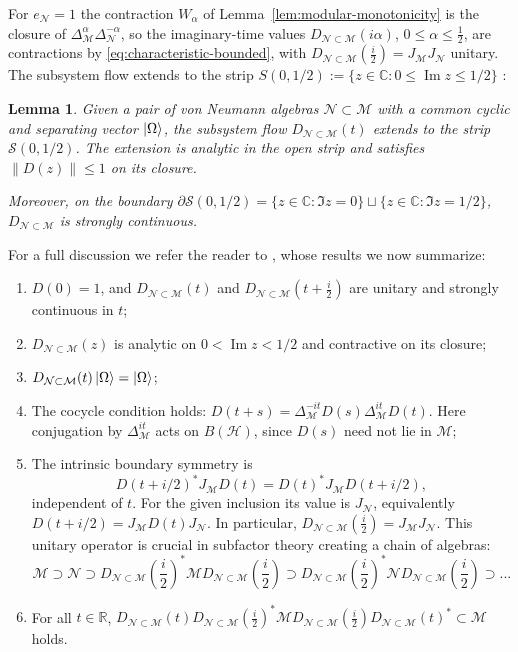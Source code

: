 \documentclass[a4paper,11pt]{article}
\newtheorem{lemma}[theorem]{Lemma}
\theoremstyle{definition}
\newcommand{\mN}{\mathcal{N}}
\newcommand{\mH}{\mathcal{H}}
\newcommand{\mM}{\mathcal{M}}
\begin{document}
For $e_{\mN}=1$ the contraction $W_\alpha$ of Lemma~\ref{lem:modular-monotonicity} is the closure of $\Delta_{\mM}^{\alpha}\Delta_{\mN}^{-\alpha}$, so the imaginary-time values $D_{\mN\subset\mM}(i\alpha)$, $0\le\alpha\le\tfrac12$, are contractions by \eqref{eq:characteristic-bounded}, with $D_{\mN\subset\mM}(\tfrac i2)=J_{\mM}J_{\mN}$ unitary. The subsystem flow extends to the strip $S(0,1/2):=\{z\in\mathbb C:0\leq\operatorname{Im}z\leq1/2\}$ \cite{revolutionizing}:
\begin{lemma}
    Given a pair of von Neumann algebras $\mN\subset\mM$ with a common cyclic and separating vector $\ket{\Omega}$, the subsystem flow $D_{\mN\subset\mM}(t)$ extends to the strip $\mathcal{S}(0,1/2)$. The extension is analytic in the open strip and satisfies $\|D(z)\|\leq1$ on its closure.

    Moreover, on the boundary $\partial\mathcal{S}(0,1/2) = \{z\in\mathbb{C}:\Im{z} = 0\}\sqcup\{z\in\mathbb{C}:\Im{z} = 1/2\}$, $D_{\mN\subset\mM}$ is strongly continuous.
\end{lemma}
For a full discussion we refer the reader to \cite{revolutionizing}, whose results we now summarize:
\begin{enumerate}
    \item $D(0)=1$, and $D_{\mN\subset\mM}(t)$ and $D_{\mN\subset\mM}(t +\frac{i}{2})$ are unitary and strongly continuous in $t$;
    \item $D_{\mN\subset\mM}(z)$ is analytic on $0<\operatorname{Im}z<1/2$ and contractive on its closure;
    \item $D_{\mN\subset\mM}(t)\ket{\Omega} = \ket{\Omega}$;
    \item The cocycle condition holds: $D(t+s)=\Delta_{\mM}^{-it}D(s)\Delta_{\mM}^{it}D(t)$. Here conjugation by $\Delta_{\mM}^{it}$ acts on $B(\mH)$, since $D(s)$ need not lie in $\mM$;
    \item The intrinsic boundary symmetry is
    \[
     D(t+i/2)^*J_{\mM} D(t)=D(t)^*J_{\mM} D(t+i/2),
    \]
    independent of $t$. For the given inclusion its value is $J_{\mN}$, equivalently
    $D(t+i/2)=J_{\mM} D(t)J_{\mN}$. In particular, $D_{\mN\subset\mM}(\frac{i}{2}) = J_{\mM}J_{\mN}$. This unitary operator is crucial in subfactor theory creating a chain of algebras:
    \begin{equation}
        \mM\supset\mN\supset D_{\mN\subset\mM}(\frac{i}{2})^*\mM D_{\mN\subset\mM}(\frac{i}{2})\supset D_{\mN\subset\mM}(\frac{i}{2})^*\mN D_{\mN\subset\mM}(\frac{i}{2})\supset...
    \end{equation}
    \item For all $t\in\mathbb{R}$, $D_{\mN\subset\mM}(t)D_{\mN\subset\mM}(\frac{i}{2})^*\mM D_{\mN\subset\mM}(\frac{i}{2})D_{\mN\subset\mM}(t)^*\subset\mM$ holds.
\end{enumerate}
\end{document}
